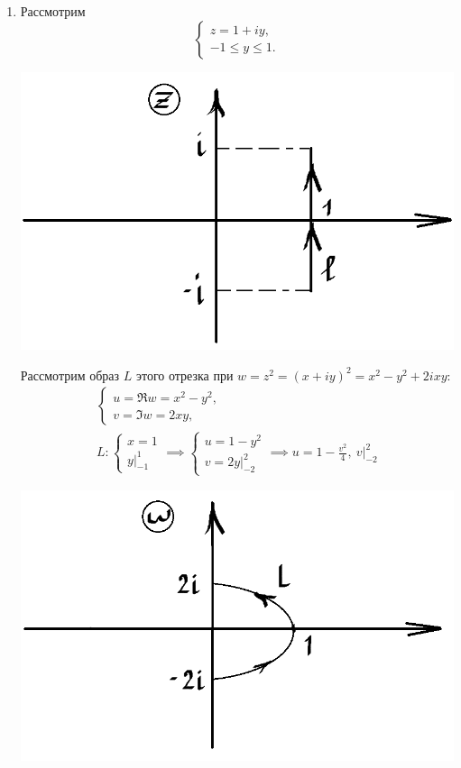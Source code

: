 \documentclass[../../main.tex]{subfiles}
\begin{document}
\begin{examples}

\;

\begin{enumerate}
\item Рассмотрим
\begin{equation*}
    \begin{cases}
        z = 1 + iy,\\
        -1 \leq y \leq 1.
    \end{cases}
\end{equation*}
\begin{center}
\includegraphics[height=0.3\textwidth]{lec30_1.png}
\end{center}

Рассмотрим образ $L$ этого отрезка при 
$w = z^2 = (x + iy)^2 = x^2 - y^2 + 2ixy$:
\begin{gather*}
    \begin{cases}
        u = \Re w = x^2 - y^2,\\
        v = \Im w = 2xy,
    \end{cases} \\
    L:
    \begin{cases}
        x = 1\\
        y\big|_{-1}^1
    \end{cases}
    \implies
    \begin{cases}
        u = 1 - y^2\\
        v = 2y\big|_{-2}^2
    \end{cases}
    \implies
    u = 1 - \frac{v^2}{4},\ v\big|_{-2}^2 
\end{gather*}

\begin{center}
\includegraphics[height=0.3\textwidth]{lec30_2.png}
\end{center}


\end{enumerate}
\end{examples}
\end{document}
